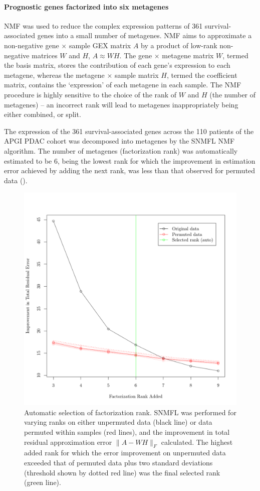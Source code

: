 \documentclass[dissertation.tex]{subfiles}
\begin{document}
\paragraph{Prognostic genes factorized into six metagenes}
\gls{NMF} was used to reduce the complex expression patterns of 361 survival-associated genes into a small number of metagenes.  \gls{NMF} aims to approximate a non-negative gene $\times$ sample \gls{GEX} matrix $A$ by a product of low-rank non-negative matrices $W$ and $H$, $A \approx W H$.  The gene $\times$ metagene matrix $W$, termed the basis matrix, stores the contribution of each gene's expression to each metagene, whereas the metagene $\times$ sample matrix $H$, termed the coefficient matrix, contains the `expression' of each metagene in each sample.  The \gls{NMF} procedure is highly sensitive to the choice of the rank of $W$ and $H$ (the number of metagenes) -- an incorrect rank will lead to metagenes inappropriately being either combined, or split.

The expression of the 361 survival-associated genes across the 110 patients of the \gls{APGI} \gls{PDAC} cohort was decomposed into metagenes by the \gls{SNMFL} \gls{NMF} algorithm.  The number of metagenes (factorization rank) was automatically estimated to be 6, being the lowest rank for which the improvement in estimation error achieved by adding the next rank, was less than that observed for permuted data ().

\begin{figure}
\centering
\includegraphics[width=.7\linewidth]{analysis/biosurv/reports/18_SIS_diag_dsd_final/figure/nmf-rank-plots-2}
\caption[Automatic selection of \acrshort{NMF} factorization rank]{Automatic selection of factorization rank.  \acrshort{SNMFL} was performed for varying ranks on either unpermuted data (black line) or data permuted within samples (red lines), and the improvement in total residual approximation error $\|A - W H\|_F$ calculated.  The highest added rank for which the error improvement on unpermuted data exceeded that of permuted data plus two standard deviations (threshold shown by dotted red line) was the final selected rank (green line).}\label{fig:sigs-nmf-rank}
\end{figure}
\end{document}

